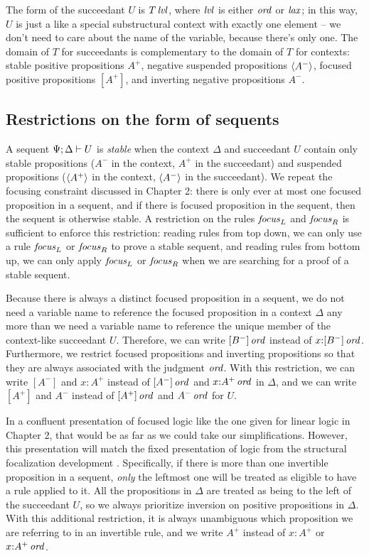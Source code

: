 The form of the succeedant $U$ is ${T}\,{{\it lvl}}$, where ${\it lvl}$ is either
${\it ord}$ or ${\it lax}$; in this way, $U$ is just a like a special
substructural context with exactly one element -- we don't need
to care about the name of the variable, because there's only one.  The
domain of $T$ for succeedants is complementary to the domain of $T$
for contexts: stable positive propositions $A^+$, negative suspended
propositions $\langle {A^-} \rangle$, focused positive propositions $[A^+]$, and
inverting negative propositions $A^-$.

\subsection{Restrictions on the form of sequents}

A sequent ${\Psi};{\Delta} \vdash {U}$ is {\it stable} when the context
$\Delta$ and succeedant $U$ contain only stable propositions ($A^-$ in
the context, $A^+$ in the succeedant) and suspended propositions
($\langle {A^+} \rangle$ in the context, $\langle {A^-} \rangle$ in the succeedant). We
repeat the focusing constraint discussed in Chapter 2: there is only
ever at most one focused proposition in a sequent, and if there is
focused proposition in the sequent, then the sequent is otherwise
stable. A restriction on the rules ${\it focus}_L$ and ${\it focus}_R$
is sufficient to enforce this restriction: reading rules from
top down, we can only use a rule ${\it focus}_L$ or ${\it focus}_R$ to
prove a stable sequent, and reading rules from bottom up, we can only
apply ${\it focus}_L$ or ${\it focus}_R$ when we are searching for a
proof of a stable sequent.

Because there is always a distinct focused proposition in a sequent,
we do not need a variable name to reference the focused proposition in
a context $\Delta$ any more than we need a variable name to reference
the unique member of the context-like succeedant $U$. Therefore, we
can write ${[B^-]}\,{{\it ord}}$ instead of $x{:}{[B^-]}\,{{\it ord}}$. Furthermore,
we restrict focused propositions and inverting propositions so that
they are always associated with the judgment ${\it ord}$. With this
restriction, we can write $[A^-]$ and $x{:}A^+$ instead of
${[A^-]}\,{{\it ord}}$ and $x{:}{A^+}\,{{\it ord}}$ in $\Delta$, and we can write
$[A^+]$ and $A^-$ instead of ${[A^+]}\,{{\it ord}}$ and ${A^-}\,{{\it ord}}$ for
$U$.

In a confluent presentation of focused logic like the one given for
linear logic in Chapter 2, that would be as far as we could take our
simplifications. However, this presentation will match the fixed
presentation of logic from the structural focalization development
\cite{simmons11structural}. Specifically, if there is more than one
invertible proposition in a sequent, {\it only} the leftmost one will
be treated as eligible to have a rule applied to it. All the
propositions in $\Delta$ are treated as being to the left of the
succeedant $U$, so we always prioritize inversion on positive
propositions in $\Delta$. With this additional restriction, it is
always unambiguous which proposition we are referring to in an
invertible rule, and we write $A^+$ instead of $x{:}A^+$ or
$x{:}{A^+}\,{{\it ord}}$.

